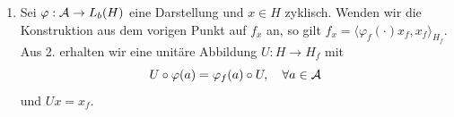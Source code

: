 \begin{remark}
\begin{enumerate}
        \item Sei $\varphi : \mathcal{A} \to L_b(H)$ eine Darstellung und $x \in H$ zyklisch. Wenden wir die Konstruktion aus dem vorigen Punkt auf $f_x$ an, so gilt $f_x = \langle \varphi_{f} (\cdot) x_f, x_f \rangle_{H_f}$. Aus 2. erhalten wir eine unitäre Abbildung $U : H \to H_f$ mit
        \[
            U \circ \varphi(a) = \varphi_f(a) \circ U, \quad \forall a \in \mathcal{A}
        \]
        und $Ux = x_f$.
    \end{enumerate}
\end{remark}